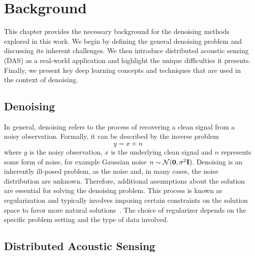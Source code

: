 \chapter{Background}\label{ch:background}

This chapter provides the necessary background for the denoising methods explored in this work.
We begin by defining the general denoising problem and discussing its inherent challenges.
We then introduce distributed acoustic sensing (DAS) as a real-world application and highlight the unique difficulties 
it presents.
Finally, we present key deep learning concepts and techniques that are used in the context of denoising.

\section{Denoising}

In general, denoising refers to the process of recovering a clean signal from a noisy observation.
Formally, it can be described by the inverse problem 
\begin{equation}
    y = x + n
\end{equation}
where $y$ is the noisy observation, $x$ is the underlying clean signal and $n$ represents some form of noise, for
example Gaussian noise $n \sim \mathcal{N}(\mathbf{0},\sigma^2\mathbf{I})$.
Denoising is an inherently ill-posed problem, as the noise and, in many cases, the noise distribution are unknown.
Therefore, additional assumptions about the solution are essential for solving the denoising problem. 
This process is known as regularization and typically involves imposing certain constraints on the solution space to 
favor more natural solutions~\cite{XXX}. 
The choice of regularizer depends on the specific problem setting and the type of data involved.

\section{Distributed Acoustic Sensing}


